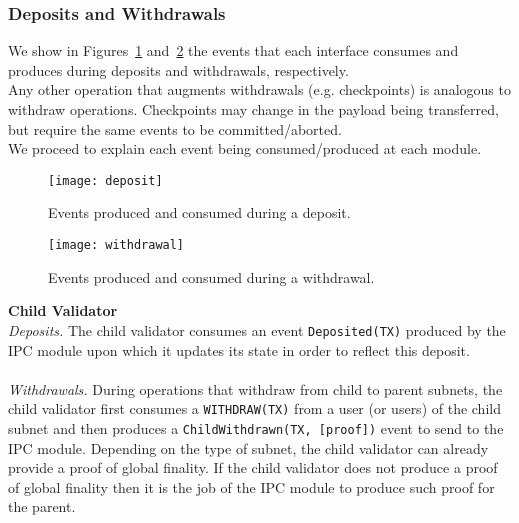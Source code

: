 \subsubsection{Deposits and Withdrawals}
 We show in Figures~\ref{fig:deposit-old} and~\ref{fig:withdrawal} the events that each interface consumes and produces during deposits and withdrawals, respectively. \\
Any other operation that augments withdrawals (e.g. checkpoints) is analogous to withdraw operations. Checkpoints may change in the payload being transferred, but require the same events to be committed/aborted.\\
We proceed to explain each event being consumed/produced at each module.
\begin{figure}
     \centering
     \texttt{[image: deposit]}
     \caption{Events produced and consumed during a deposit.}
     \label{fig:deposit-old}
 \end{figure}
 
 \begin{figure}
     \centering
     \texttt{[image: withdrawal]}
     \caption{Events produced and consumed during a withdrawal.}
     \label{fig:withdrawal}
 \end{figure}
\noindent\textbf{Child Validator}\\
\textit{Deposits.} The child validator consumes an event \texttt{Deposited(TX)} produced by the IPC module upon which it updates its state in order to reflect this deposit. \\~\\
\textit{Withdrawals.} During operations that withdraw from child to parent subnets, the child validator first consumes a \texttt{WITHDRAW(TX)} from a user (or users) of the child subnet and then produces a \texttt{ChildWithdrawn(TX, [proof])} event to send to the IPC module. 
Depending on the type of subnet, the child validator can already provide a proof of global finality. If the child validator does not produce a proof of global finality then it is the job of the IPC module to produce such proof for the parent.\\~\\

